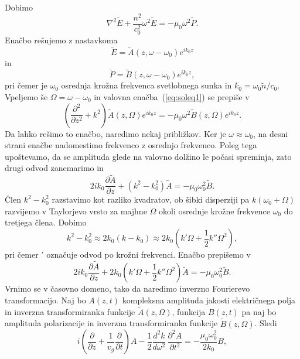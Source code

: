 Dobimo
\begin{equation}
\nabla^{2}\tilde{E}+\frac{n^2}{c_0^{2}}\omega^2 \tilde{E}=
- \mu_{0}\omega^2 \tilde{P}.
\label{eq:soleq1}
\end{equation}
Enačbo rešujemo z nastavkoma
\begin{equation}
\tilde{E} = \tilde{A} (z,\omega - \omega_0) e^{ik_0z}
\end{equation}
in 
\begin{equation}
 \tilde{P} = \tilde{B} (z,\omega - \omega_0) e^{ik_0z},
\end{equation}
pri čemer je $\omega_0$ osrednja krožna frekvenca svetlobnega sunka in $k_0 = \omega_0 \tilde{n}/c_0$. 
Vpeljemo še 
$\Omega =\omega - \omega_0$ in valovna enačba~(\ref{eq:soleq1}) se prepiše v 
\begin{equation}
\left(\frac{\partial^2}{\partial z^2}+k^2\right)\tilde{A}(z,\Omega) e^{ik_0z} =
- \mu_{0}\omega^2 \tilde{B} (z,\Omega) e^{ik_0z}.
\end{equation}
Da lahko rešimo to enačbo, naredimo nekaj približkov. Ker je $\omega \approx \omega_0$, na desni strani
enačbe nadomestimo frekvenco z osrednjo frekvenco. Poleg tega upoštevamo, da se amplituda 
glede na valovno dolžino le počasi spreminja, zato drugi odvod zanemarimo in 
\begin{equation}
2 i k_0 \frac{\partial \tilde{A}}{\partial z} + (k^2-k_0^2) \tilde{A} = - \mu_{0}\omega_0^2 \tilde{B}.
\end{equation}
Člen $k^2 - k_0^2$ razstavimo kot razliko kvadratov, ob šibki disperziji pa $k(\omega_0 + \Omega)$
razvijemo v Taylorjevo vrsto za majhne $\Omega$ 
okoli osrednje krožne frekvence $\omega_0$ do tretjega člena. Dobimo
\begin{equation}
k^2 - k_0^2 \approx 2k_0 (k-k_0) \approx 2k_0 (k'\Omega + \frac{1}{2}k''\Omega^2),
\end{equation}
pri čemer $'$ označuje odvod po krožni frekvenci. Enačbo prepišemo v 
\begin{equation}
2 i k_0 \frac{\partial \tilde{A}}{\partial z} + 2k_0(k'\Omega + \frac{1}{2}k''\Omega^2) \tilde{A} 
= - \mu_{0}\omega_0^2 \tilde{B}.
\end{equation}
Vrnimo se v časovno domeno, tako da naredimo inverzno Fourierevo transformacijo. Naj bo 
$A(z,t)$ kompleksna amplituda jakosti električnega polja in inverzna transformiranka 
funkcije $\tilde{A}(z,\Omega)$, funkcija $B(z,t)$ pa naj bo 
amplituda polarizacije in inverzna transformiranka 
funkcije $\tilde{B}(z,\Omega)$.
Sledi
\begin{equation}
i \left(\frac{\partial}{\partial z}+\frac{1}{v_{g}}\frac{\partial}{\partial t}\right)A-
\frac{1}{2}\frac{d^{2}k}{d\omega^{2}}\,\frac{\partial^{2}A}{\partial t^{2}}=
-\frac{\mu_0\omega_0^2}{2 k_0}B,
\label{8.93}
\end{equation}
